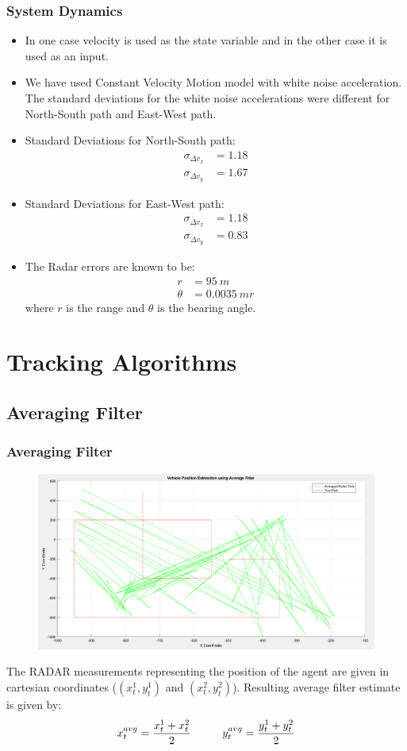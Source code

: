 \documentclass{beamer}
\begin{document}
\begin{frame}
\frametitle{System Dynamics}
\begin{itemize}
    \item In one case velocity is used as the state variable and in the other case it is used as an input.
    \item We have used Constant Velocity Motion model with white noise acceleration. The standard deviations for the white noise accelerations were different for North-South path and East-West path.
    \item Standard Deviations for North-South path:
    \begin{align*}
        \sigma_{\Delta v_x} &= 1.18 \\
        \sigma_{\Delta v_y} &= 1.67
    \end{align*}
    \item Standard Deviations for East-West path:
    \begin{align*}
        \sigma_{\Delta v_x} &= 1.18 \\
        \sigma_{\Delta v_y} &= 0.83
    \end{align*}
    \item The Radar errors are known to be:
    \begin{align*}
        r &= 95 \ m \\
        \theta &= 0.0035 \ mr
    \end{align*}
    where $r$ is the range and $\theta$ is the bearing angle.
\end{itemize}
\end{frame}

\section{Tracking Algorithms}
\subsection{Averaging Filter}
\begin{frame}
\frametitle{Averaging Filter}
\begin{figure}
\includegraphics[width=0.65\linewidth]{avg_filter.png}
\end{figure}
The RADAR measurements representing the position of the agent are given in cartesian coordinates ($(x^1_t, y^1_t)$ and $(x^2_t, y^2_t)$). Resulting average filter estimate is given by:
\begin{equation*}
    x^{avg}_t = \frac{x^1_t + x^2_t}{2} \hspace*{1cm}
    y^{avg}_t = \frac{y^1_t + y^2_t}{2}
\end{equation*}
\end{frame}
\end{document}
